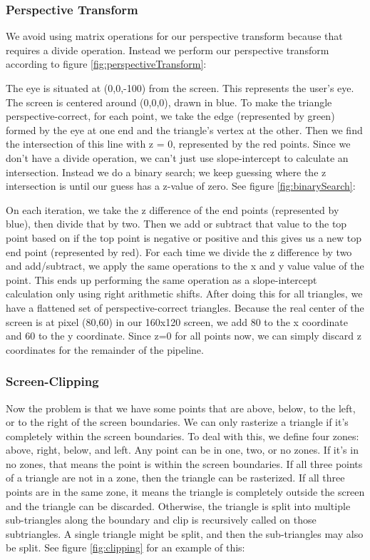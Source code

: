 \documentclass[onecolumn]{IEEEtran}
\begin{document}
\subsubsection{Perspective Transform}
We avoid using matrix operations for our perspective transform because that requires a divide operation.  Instead we perform our perspective transform according to figure \ref{fig:perspectiveTransform}:


The eye is situated at (0,0,-100) from the screen.  This represents the user’s eye.  The screen is centered around (0,0,0), drawn in blue.  To make the triangle perspective-correct, for each point, we take the edge (represented by green) formed by the eye at one end and the triangle’s vertex at the other.  Then we find the intersection of this line with z = 0, represented by the red points.  Since we don’t have a divide operation, we can’t just use slope-intercept to calculate an intersection.  Instead we do a binary search; we keep guessing where the z intersection is until our guess has a z-value of zero.  See figure \ref{fig:binarySearch}:


On each iteration, we take the z difference of the end points (represented by blue), then divide that by two.  Then we add or subtract that value to the top point based on if the top point is negative or positive and this gives us a new top end point (represented by red).  For each time we divide the z difference by two and add/subtract, we apply the same operations to the x and y value value of the point.  This ends up performing the same operation as a slope-intercept calculation only using right arithmetic shifts.  After doing this for all triangles, we have a flattened set of perspective-correct triangles.  Because the real center of the screen is at pixel (80,60) in our 160x120 screen, we add 80 to the x coordinate and 60 to the y coordinate.  Since z=0 for all points now, we can simply discard z coordinates for the remainder of the pipeline.

\subsubsection{Screen-Clipping}
Now the problem is that we have some points that are above, below, to the left, or to the right of the screen boundaries.  We can only rasterize a triangle if it’s completely within the screen boundaries.  To deal with this, we define four zones: above, right, below, and left.  Any point can be in one, two, or no zones.  If it’s in no zones, that means the point is within the screen boundaries.  If all three points of a triangle are not in a zone, then the triangle can be rasterized.  If all three points are in the same zone, it means the triangle is completely outside the screen and the triangle can be discarded.  Otherwise, the triangle is split into multiple sub-triangles along the boundary and clip is recursively called on those subtriangles.  A single triangle might be split, and then the sub-triangles may also be split.  See figure \ref{fig:clipping} for an example of this:
\end{document}
